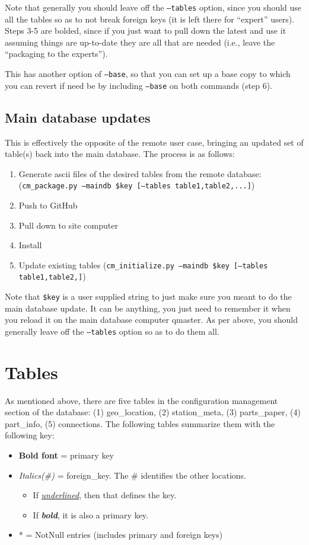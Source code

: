 \documentclass{article}
\begin{document}
Note that generally you should leave off the {\tt --tables} option, since you should use all the tables so as to not break foreign keys (it is left there for ``expert'' users).  Steps 3-5 are bolded, since if you just want to pull down the latest and use it assuming things are up-to-date they are all that are needed (i.e., leave the ``packaging to the experts'').

This has another option of {\tt --base}, so that you can set up a base copy to which you can revert if need be by including {\tt --base} on both commands (step 6).
	
\subsection{Main database updates}
This is effectively the opposite of the remote user case, bringing an updated set of table(s) back into the main database.  The process is as follows:
\begin{enumerate}\setlength\itemsep{-.3em}
	\item  Generate ascii files of the desired tables from the remote database: 
		({\tt cm\_package.py --maindb \$key [--tables table1,table2,...]})
	\item Push to GitHub
	\item Pull down to site computer
	\item Install
	\item Update existing tables  ({\tt cm\_initialize.py --maindb \$key [--tables table1,table2,]})
\end{enumerate}

Note that {\tt \$key} is a user supplied string to just make sure you meant to do the main database update.  It can be anything, you
just need to remember it when you reload it on the main database computer qmaster.
As per above, you should generally leave off the {\tt --tables} option so as to do them all.  

\section{Tables}
As mentioned above, there are five tables in the configuration management section of the database:  (1) geo\_location, (2) station\_meta,
(3) parts\_paper, (4) part\_info, (5) connections.  The following tables summarize them with the following key:  
\begin{itemize}\setlength\itemsep{-.3em}
	\item {\bf Bold font} = primary key
	\item {\em Italics(\#)} = foreign\_key.    The \# identifies the other locations.
	\vspace{-.1in}
	\begin{itemize}\setlength\itemsep{-.3em}
		\item If {\em \underline{underlined}}, then that defines the key.
		\item If {\em {\bf bold}}, it is also a primary key.
	\end{itemize}
	\vspace{-.08in}
	\item * = NotNull entries (includes primary and foreign keys)
\end{itemize}
\end{document}
